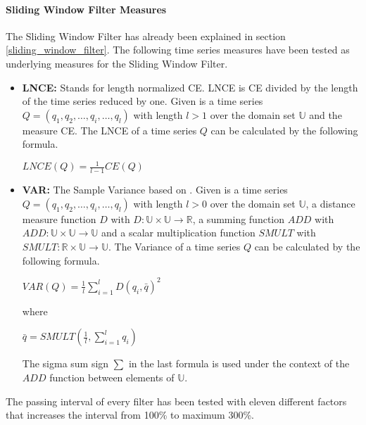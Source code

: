 \paragraph{Sliding Window Filter Measures} \label{sliding_window_filter_measures}
The Sliding Window Filter has already been explained in section \ref{sliding_window_filter}. The following time series
measures have been tested as underlying measures for the Sliding Window Filter.

\begin{itemize}
    \item \textbf{LNCE:} Stands for length normalized CE. LNCE is CE divided by the length of the time series reduced by
    one. Given is a time series $Q = (q_1, q_2, \dots, q_i, \dots, q_l)$ with length $l > 1$ over the domain set
    $\mathbb{U}$ and the measure CE. The LNCE of a time series $Q$ can be calculated by the following formula.
    \begin{center}
        $LNCE(Q) = \frac{1}{l - 1}CE(Q)$
    \end{center}
    \item \textbf{VAR:} The Sample Variance based on \cite{chan1983algorithms}. Given is a time series
    $Q = (q_1, q_2, \dots, q_i, \dots, q_l)$ with length $l > 0$ over the domain set $\mathbb{U}$, a distance measure
    function $D$ with $D: \mathbb{U} \times \mathbb{U} \to \mathbb{R}$, a summing function $ADD$ with
    $ADD: \mathbb{U} \times \mathbb{U} \to \mathbb{U}$ and a scalar multiplication function $SMULT$ with
    $SMULT: \mathbb{R} \times \mathbb{U} \to \mathbb{U}$. The Variance of a time series $Q$ can be calculated by the
    following formula.
    \begin{center}
        $VAR(Q) = \frac{1}{l}\sum \limits_{i=1}^{l} D(q_i, \bar{q})^2$
    \end{center}
    where
    \begin{center}
        $\bar{q} = SMULT(\frac{1}{l}, \sum \limits_{i=1}^{l} q_i)$
    \end{center}
    The sigma sum sign $\sum$ in the last formula is used under the context of the $ADD$ function between elements of
    $\mathbb{U}$.
\end{itemize}
The passing interval of every filter has been tested with eleven different factors that increases the interval from
100\% to maximum 300\%.
